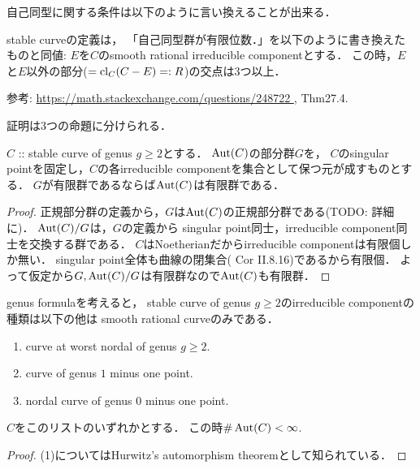 \documentclass[a4paper]{jsarticle}
\begin{document}
    自己同型に関する条件は以下のように言い換えることが出来る．
    \begin{Prop}\label{prop:finauto}
        stable curveの定義は，
        「自己同型群が有限位数．」を以下のように書き換えたものと同値:
        $E$を$C$のsmooth rational irreducible componentとする．
        この時，$E$と$E$以外の部分($=\operatorname{cl}_C(C-E)=:R$)の交点は$3$つ以上．
    \end{Prop}
    
    参考: \url{ https://math.stackexchange.com/questions/248722 },
    \cite{HarDef} Thm27.4.

    証明は3つの命題に分けられる．

    \begin{Claim}
        $C$ :: stable curve of genus $g \geq 2$とする．
        $\operatorname{Aut}(C)$の部分群$G$を，
        $C$のsingular pointを固定し，$C$の各irreducible componentを集合として保つ元が成すものとする．
        $G$が有限群であるならば$\operatorname{Aut}(C)$は有限群である．
    \end{Claim}
    \begin{proof}
        正規部分群の定義から，$G$は$\operatorname{Aut}(C)$の正規部分群である(TODO: 詳細に)．
        $\operatorname{Aut}(C)/G$は，$G$の定義から
        singular point同士，irreducible component同士を交換する群である．
        $C$はNoetherianだからirreducible componentは有限個しか無い．
        singular point全体も曲線の閉集合(\cite{HarAG} Cor II.8.16)であるから有限個．
        よって仮定から$G, \operatorname{Aut}(C)/G$は有限群なので$\operatorname{Aut}(C)$も有限群．
    \end{proof}

    \begin{Claim}
        genus formulaを考えると，
        stable curve of genus $g \geq 2$のirreducible componentの種類は以下の他は
        smooth rational curveのみである．
        \begin{enumerate}[label=(\arabic*)]
            \item curve at worst nordal of genus $g \geq 2$.
            \item curve of genus $1$ minus one point.
            \item nordal curve of genus $0$ minus one point.
        \end{enumerate}
        $C$をこのリストのいずれかとする．
        この時$\# \operatorname{Aut}(C) < \infty$.
    \end{Claim}
    \begin{proof}
        (1)についてはHurwitz's automorphism theoremとして知られている．
    \end{proof}
\end{document}

